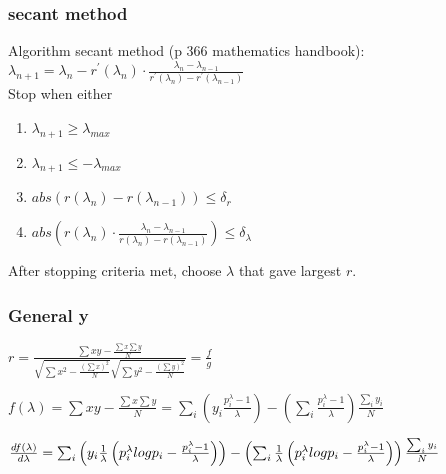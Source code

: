 \subsubsection*{secant method}
Algorithm secant method (p 366 mathematics handbook):\\
\begin{math}
\lambda_{n+1}=\lambda_n-
r^{'}\left(\lambda_{n}\right)\cdot\frac{\lambda_n-\lambda_{n-1}}{r^{'}\left(\lambda_n\right)-r^{'}\left(\lambda_{n-1}\right)}
\end{math}\\
Stop when either
\begin{enumerate}
\item $\lambda_{n+1}\geq\lambda_{max}$
\item $\lambda_{n+1}\leq-\lambda_{max}$
\item \begin{math}abs\left(r\left(\lambda_n\right)-r\left(\lambda_{n-1}\right)\right)\leq \delta_{r}
\end{math}
\item
\begin{math}
abs\left(r\left(\lambda_{n}\right)\cdot\frac{\lambda_n-\lambda_{n-1}}{r\left(\lambda_n\right)-r\left(\lambda_{n-1}\right)}\right)\leq\delta_{\lambda}
\end{math}
\end{enumerate}
After stopping criteria met, choose $\lambda$ that gave largest $r$.



\subsubsection*{General y}
\begin{math}
r=\frac{\sum{xy}-\frac{\sum{x}\sum{y}}{N}}
{\sqrt{\sum{x^2}-\frac{\left(\sum{x}\right)^2}{N}}\sqrt{\sum{y^2}-\frac{\left(\sum{y}\right)^2}{N}}}=\frac{f}{g}
\end{math}


\begin{math}
f(\lambda)=\sum{xy}-\frac{\sum{x}\sum{y}}{N}
=
\sum_i \left(y_i\frac{p_i^{\lambda}-1}{\lambda}\right) - \left(\sum_i\frac{p_i^{\lambda}-1}{\lambda}\right)\frac{\sum_iy_i}{N}
\end{math}

\begin{math}
\frac{df(\lambda)}{d\lambda}
=\sum_i\left(y_i\frac{1}{\lambda}\left(p_i^{\lambda}log{p_i}-\frac{p_i^{\lambda}-1}{\lambda}\right)\right)
-\left( \sum_i\frac{1}{\lambda}\left(p_i^{\lambda}log{p_i}-\frac{p_i^{\lambda}-1}{\lambda}\right)\right)
\frac{\sum_iy_i}{N} \\
\end{math}


